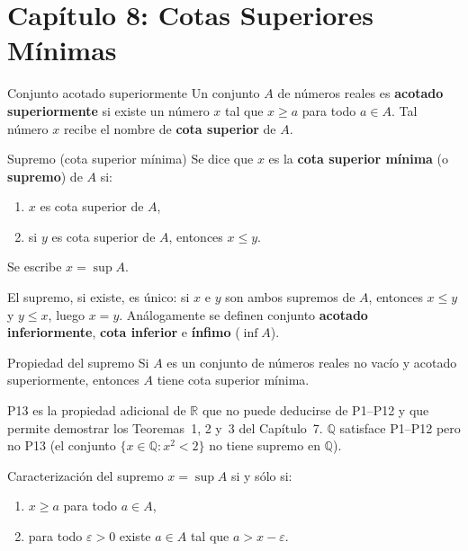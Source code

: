 \documentclass[12pt]{article}
\begin{document}
\section{Capítulo 8: Cotas Superiores Mínimas}

\begin{definicion}[]{Conjunto acotado superiormente}
Un conjunto $A$ de números reales es \textbf{acotado superiormente} si existe un número $x$ tal que $x \geq a$ para todo $a \in A$. Tal número $x$ recibe el nombre de \textbf{cota superior} de $A$.
\end{definicion}

\begin{definicion}[]{Supremo (cota superior mínima)}
Se dice que $x$ es la \textbf{cota superior mínima} (o \textbf{supremo}) de $A$ si:
\begin{enumerate}
  \item[(1)] $x$ es cota superior de $A$,
  \item[(2)] si $y$ es cota superior de $A$, entonces $x \leq y$.
\end{enumerate}
Se escribe $x = \sup A$.
\end{definicion}

\begin{nota}[]{}
El supremo, si existe, es único: si $x$ e $y$ son ambos supremos de $A$, entonces $x \leq y$ y $y \leq x$, luego $x = y$. Análogamente se definen conjunto \textbf{acotado inferiormente}, \textbf{cota inferior} e \textbf{ínfimo} ($\inf A$).
\end{nota}

\begin{axioma}[P13]{Propiedad del supremo}
Si $A$ es un conjunto de números reales no vacío y acotado superiormente, entonces $A$ tiene cota superior mínima.
\end{axioma}

\begin{nota}[]{}
P13 es la propiedad adicional de $\mathbb{R}$ que no puede deducirse de P1--P12 y que permite demostrar los Teoremas~1, 2 y~3 del Capítulo~7. $\mathbb{Q}$ satisface P1--P12 pero no P13 (el conjunto $\{x \in \mathbb{Q} : x^2 < 2\}$ no tiene supremo en $\mathbb{Q}$).
\end{nota}

\begin{proposicion}[]{Caracterización del supremo}
$x = \sup A$ si y sólo si:
\begin{enumerate}
  \item[(1)] $x \geq a$ para todo $a \in A$,
  \item[(2)] para todo $\varepsilon > 0$ existe $a \in A$ tal que $a > x - \varepsilon$.
\end{enumerate}
\end{proposicion}
\end{document}
